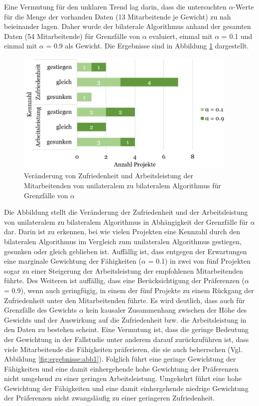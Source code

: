 Eine Vermutung für den unklaren Trend lag darin, dass die untersuchten $\alpha$-Werte für die Menge der vorhanden Daten (13 Mitarbeitende je Gewicht) zu nah beieinander lagen.
Daher wurde der bilaterale Algorithmus anhand der gesamten Daten (54 Mitarbeitende) für Grenzfälle von $\alpha$ evaluiert, einmal mit $\alpha$ = 0.1 und einmal mit $\alpha$ = 0.9 als Gewicht.
Die Ergebnisse sind in Abbildung \ref{fig:diskussion:abb1} dargestellt.

\begin{figure}[H]
    \centering
	\includegraphics[width=0.95\textwidth]{gfx/verhaeltnis-z-a-projekte-edge-cases.png}
	\caption[Veränderung von Zufriedenheit und Arbeitsleistung der Mitarbeitenden von unilateralem zu bilateralem Algorithmus für Grenzfälle von $\alpha$]{Veränderung von Zufriedenheit und Arbeitsleistung der Mitarbeitenden von unilateralem zu bilateralem Algorithmus für Grenzfälle von $\alpha$}
	\label{fig:diskussion:abb1}
\end{figure}

Die Abbildung stellt die Veränderung der Zufriedenheit und der Arbeitsleistung von unilateralem zu bilateralem Algorithmus in Abhängigkeit der Grenzfälle für $\alpha$ dar.
Darin ist zu erkennen, bei wie vielen Projekten eine Kennzahl durch den bilateralen Algorithmus im Vergleich zum unilateralen Algorithmus gestiegen, gesunken oder gleich geblieben ist.
Auffällig ist, dass entgegen der Erwartungen eine marginale Gewichtung der Fähigkeiten ($\alpha$ = 0.1) in zwei von fünf Projekten sogar zu einer Steigerung der Arbeitsleistung der empfohlenen Mitarbeitenden führte.
Des Weiteren ist auffällig, dass eine Berücksichtigung der Präferenzen ($\alpha$ = 0.9), wenn auch geringfügig, in einem der fünf Projekte zu einem Rückgang der Zufriedenheit unter den Mitarbeitenden führte.
Es wird deutlich, dass auch für Grenzfälle des Gewichts $\alpha$ kein kausaler Zusammenhang zwischen der Höhe des Gewichts und der Auswirkung auf die Zufriedenheit bzw. die Arbeitsleistung in den Daten zu bestehen scheint.
Eine Vermutung ist, dass die geringe Bedeutung der Gewichtung in der Fallstudie unter anderem darauf zurückzuführen ist, dass viele Mitarbeitende die Fähigkeiten präferieren, die sie auch beherrschen (Vgl. Abbildung \ref{fig:ergebnisse:abb1}).
Folglich führt eine geringe Gewichtung der Fähigkeiten und eine damit einhergehende hohe Gewichtung der Präferenzen nicht umgehend zu einer geringen Arbeitsleistung.
Umgekehrt führt eine hohe Gewichtung der Fähigkeiten und eine damit einhergehende niedrige Gewichtung der Präferenzen nicht zwangsläufig zu einer geringeren Zufriedenheit.

